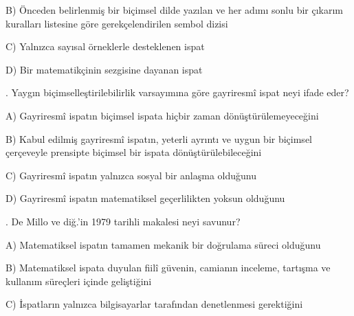 \par\noindent\hspace*{1.6em}B) Önceden belirlenmiş bir biçimsel dilde yazılan ve her adımı sonlu bir çıkarım kuralları listesine göre gerekçelendirilen sembol dizisi

\par\noindent\hspace*{1.6em}C) Yalnızca sayısal örneklerle desteklenen ispat

\par\noindent\hspace*{1.6em}D) Bir matematikçinin sezgisine dayanan ispat

\par\smallskip{}. Yaygın biçimselleştirilebilirlik varsayımına göre gayriresmî ispat neyi ifade eder?

\par\noindent\hspace*{1.6em}A) Gayriresmî ispatın biçimsel ispata hiçbir zaman dönüştürülemeyeceğini

\par\noindent\hspace*{1.6em}B) Kabul edilmiş gayriresmî ispatın, yeterli ayrıntı ve uygun bir biçimsel çerçeveyle prensipte biçimsel bir ispata dönüştürülebileceğini

\par\noindent\hspace*{1.6em}C) Gayriresmî ispatın yalnızca sosyal bir anlaşma olduğunu

\par\noindent\hspace*{1.6em}D) Gayriresmî ispatın matematiksel geçerlilikten yoksun olduğunu

\par\smallskip{}. De Millo ve diğ.’in 1979 tarihli makalesi neyi savunur?

\par\noindent\hspace*{1.6em}A) Matematiksel ispatın tamamen mekanik bir doğrulama süreci olduğunu

\par\noindent\hspace*{1.6em}B) Matematiksel ispata duyulan fiilî güvenin, camianın inceleme, tartışma ve kullanım süreçleri içinde geliştiğini

\par\noindent\hspace*{1.6em}C) İspatların yalnızca bilgisayarlar tarafından denetlenmesi gerektiğini

